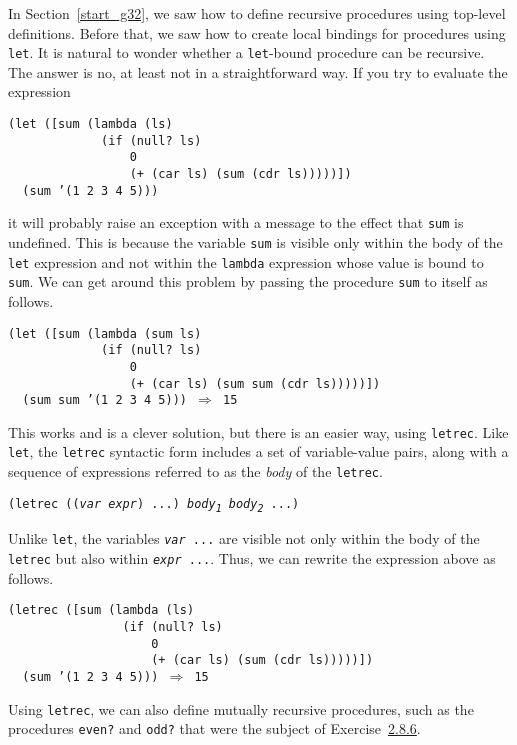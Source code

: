 \label{further_s32}In Section \ref{start_g32}, we saw how
to define recursive procedures using top-level definitions.
Before that, we saw how to create local bindings for procedures using
\label{further_s33}\texttt{let}.
It is natural to wonder whether a \texttt{let}-bound procedure can be
recursive.
The answer is no, at least not in a straightforward way.
If you try to evaluate the \label{further_s34}expression


\begin{alltt}
(let ([sum (lambda (ls)
             (if (null? ls)
                 0
                 (+ (car ls) (sum (cdr ls)))))])
  (sum '(1 2 3 4 5)))
\end{alltt}


it will probably raise an exception with a message to the effect that \texttt{sum} is
undefined.
This is because the variable \texttt{sum} is visible only within the body
of the \texttt{let} expression and not within the \texttt{lambda} expression
whose value is bound to \texttt{sum}.
We can get around this problem by passing the procedure \texttt{sum} to itself
as follows.


\begin{alltt}
(let ([sum (lambda (sum ls)
             (if (null? ls)
                 0
                 (+ (car ls) (sum sum (cdr ls)))))])
  (sum sum '(1 2 3 4 5))) \(\Rightarrow\) 15
\end{alltt}


This works and is a clever solution, but there is an easier way,
using \label{further_s35}\texttt{letrec}.
Like \texttt{let}, the
\texttt{letrec} syntactic form includes a set of variable-value pairs,
along with a sequence of expressions referred to as the \textit{body} of the
\texttt{letrec}.


\texttt{(letrec ((\textit{var} \textit{expr}) ...) \textit{body\textsubscript{1}} \textit{body\textsubscript{2}} ...)}

Unlike \texttt{let}, the variables \texttt{\textit{var} ...} are visible not
only within the body of the \texttt{letrec} but also within
\texttt{\textit{expr} ...}.
Thus, we can rewrite the expression above as follows.


\begin{alltt}
(letrec ([sum (lambda (ls)
                (if (null? ls)
                    0
                    (+ (car ls) (sum (cdr ls)))))])
  (sum '(1 2 3 4 5))) \(\Rightarrow\) 15
\end{alltt}


Using \texttt{letrec}, we can also define \label{further_s36}mutually recursive procedures, such
as the procedures \label{further_s37}\texttt{even?} and \label{further_s38}\texttt{odd?} that were the subject of
Exercise \hyperref[start_g38]{2.8.6}.


